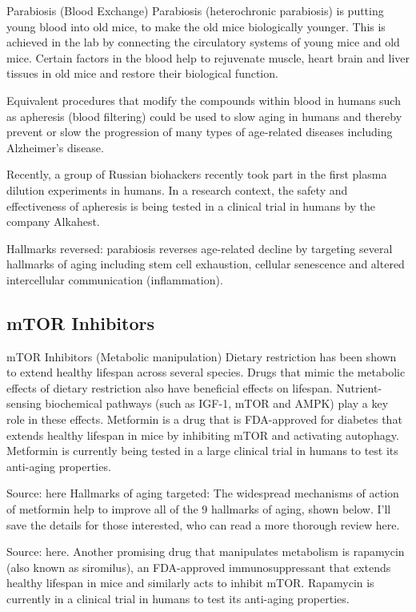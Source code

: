 \begin{frame}[c]{Parabiosis (Blood Exchange)}
    Parabiosis (heterochronic parabiosis) is putting young blood into old mice, to make the old mice biologically younger. This is achieved in the lab by connecting the circulatory systems of young mice and old mice. Certain factors in the blood help to rejuvenate muscle, heart brain and liver tissues in old mice and restore their biological function. 

Equivalent procedures that modify the compounds within blood in humans such as apheresis (blood filtering) could be used to slow aging in humans and thereby prevent or slow the progression of many types of age-related diseases including Alzheimer's disease. 

Recently, a group of Russian biohackers recently took part in the first plasma dilution experiments in humans. In a research context, the safety and effectiveness of apheresis is being tested in a clinical trial in humans by the company Alkahest. 

Hallmarks reversed: parabiosis reverses age-related decline by targeting several hallmarks of aging including stem cell exhaustion, cellular senescence and altered intercellular communication (inflammation).
\end{frame}



\subsection{mTOR Inhibitors}

\begin{frame}[c]{mTOR Inhibitors (Metabolic manipulation)}
    Dietary restriction has been shown to extend healthy lifespan across several species. Drugs that mimic the metabolic effects of dietary restriction also have beneficial effects on lifespan. Nutrient-sensing biochemical pathways (such as IGF-1, mTOR and AMPK) play a key role in these effects. Metformin is a drug that is FDA-approved for diabetes that extends healthy lifespan in mice by inhibiting mTOR and activating autophagy. Metformin is currently being tested in a large clinical trial in humans to test its anti-aging properties.


Source: here
Hallmarks of aging targeted: The widespread mechanisms of action of metformin help to improve all of the 9 hallmarks of aging, shown below. I'll save the details for those interested, who can read a more thorough review here. 


Source: here.
Another promising drug that manipulates metabolism is rapamycin (also known as siromilus), an FDA-approved immunosuppressant that extends healthy lifespan in mice and similarly acts to inhibit mTOR. Rapamycin is currently in a clinical trial in humans to test its anti-aging properties. 
\end{frame}


